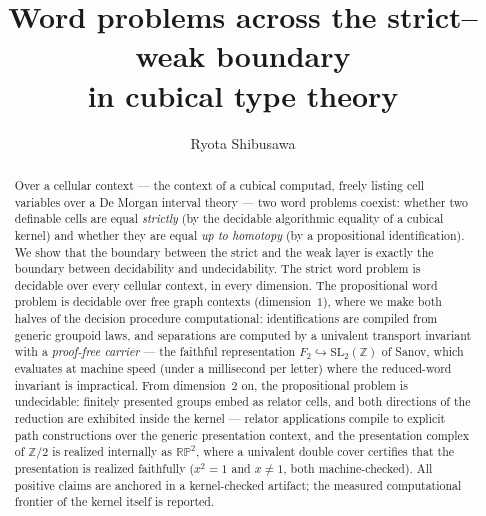 \documentclass[11pt]{amsart}
\theoremstyle{definition}
\newcommand{\Ftwo}{F_2}
\newcommand{\SL}{\mathrm{SL}_2(\mathbb{Z})}
\newcommand{\RP}{\mathbb{RP}^2}
\begin{document}
\title[Word problems across the strict--weak boundary]{Word problems
  across the strict--weak boundary\\ in cubical type theory}

\author{Ryota Shibusawa}
\address{Daiichi Institute of Technology, Japan}


\begin{abstract}
  Over a cellular context --- the context of a cubical computad,
  freely listing cell variables over a De Morgan interval theory ---
  two word problems coexist: whether two definable cells are equal
  \emph{strictly} (by the decidable algorithmic equality of a cubical
  kernel) and whether they are equal \emph{up to homotopy} (by a
  propositional identification).  We show that the boundary between
  the strict and the weak layer is exactly the boundary between
  decidability and undecidability.  The strict word problem is
  decidable over every cellular context, in every dimension.  The
  propositional word problem is decidable over free graph contexts
  (dimension~$1$), where we make both halves of the decision
  procedure computational: identifications are compiled from generic
  groupoid laws, and separations are computed by a
  univalent transport invariant with a \emph{proof-free carrier} ---
  the faithful representation $\Ftwo \hookrightarrow \SL$ of Sanov,
  which evaluates at machine speed (under a millisecond per letter)
  where the reduced-word invariant is impractical.  From
  dimension~$2$ on, the propositional problem is undecidable:
  finitely presented groups embed as relator cells, and both
  directions of the reduction are exhibited inside the kernel ---
  relator applications compile to explicit path constructions over
  the generic presentation context, and the presentation complex of
  $\mathbb{Z}/2$ is realized internally as $\RP$, where a
  univalent double cover certifies that the presentation is realized
  faithfully ($x^2 = 1$ and $x \neq 1$, both machine-checked).  All
  positive claims are anchored in a kernel-checked artifact; the
  measured computational frontier of the kernel itself is reported.
\end{abstract}

\maketitle
\end{document}
